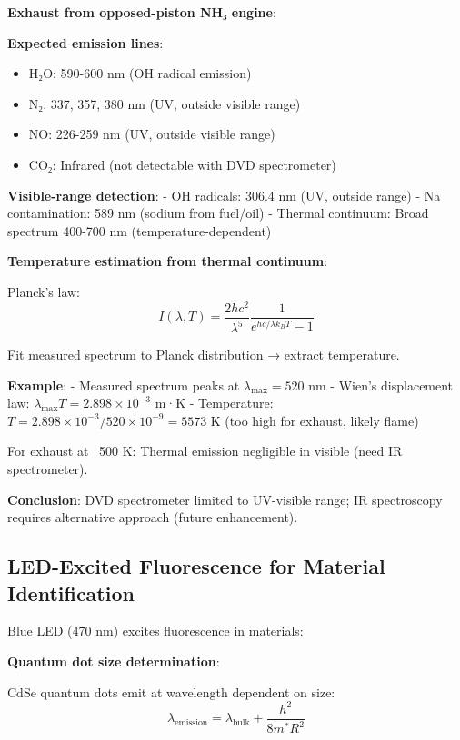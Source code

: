 \documentclass[12pt,a4paper]{article}
\begin{document}
\textbf{Exhaust from opposed-piston NH₃ engine}:

\textbf{Expected emission lines}:
\begin{itemize}
\item H₂O: 590-600 nm (OH radical emission)
\item N₂: 337, 357, 380 nm (UV, outside visible range)
\item NO: 226-259 nm (UV, outside visible range)
\item CO₂: Infrared (not detectable with DVD spectrometer)
\end{itemize}

\textbf{Visible-range detection}:
- OH radicals: 306.4 nm (UV, outside range)
- Na contamination: 589 nm (sodium from fuel/oil)
- Thermal continuum: Broad spectrum 400-700 nm (temperature-dependent)

\textbf{Temperature estimation from thermal continuum}:

Planck's law:
\begin{equation}
I(\lambda, T) = \frac{2hc^2}{\lambda^5} \frac{1}{e^{hc/\lambda k_B T} - 1}
\end{equation}

Fit measured spectrum to Planck distribution → extract temperature.

\textbf{Example}:
- Measured spectrum peaks at $\lambda_{\text{max}} = 520$ nm
- Wien's displacement law: $\lambda_{\text{max}} T = 2.898 \times 10^{-3}$ m·K
- Temperature: $T = 2.898 \times 10^{-3} / 520 \times 10^{-9} = 5573$ K (too high for exhaust, likely flame)

For exhaust at ~500 K: Thermal emission negligible in visible (need IR spectrometer).

\textbf{Conclusion}: DVD spectrometer limited to UV-visible range; IR spectroscopy requires alternative approach (future enhancement).

\subsection{LED-Excited Fluorescence for Material Identification}

Blue LED (470 nm) excites fluorescence in materials:

\textbf{Quantum dot size determination}:

CdSe quantum dots emit at wavelength dependent on size:
\begin{equation}
\lambda_{\text{emission}} = \lambda_{\text{bulk}} + \frac{h^2}{8m^* R^2}
\end{equation}
\end{document}
